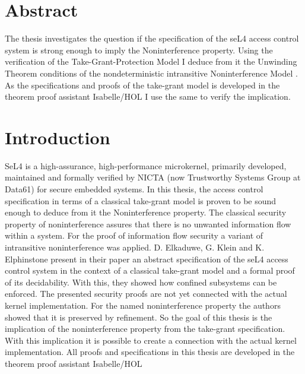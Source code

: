 \documentclass[pdftex,12pt,a4paper]{article}
\begin{document}
	
	\deckblatt
	
	\erklaerung
	
	\clearpage
	\section*{Abstract}
	
	 The thesis investigates the question if the specification of the seL4 access control system is strong enough to imply the Noninterference property. 
Using the verification of the Take-Grant-Protection Model \citep{TakeG} I deduce from it the Unwinding Theorem conditions of the nondeterministic intransitive Noninterference Model \citep{NonOp}. 
As the specifications and proofs of the take-grant model is developed in the theorem proof assistant Isabelle/HOL I use the same to verify the implication. 
	

	\newpage
	
	\tableofcontents
	
	\clearpage
	\section{Introduction}
	SeL4 is a high-assurance, high-performance microkernel, primarily developed, maintained and formally verified by NICTA (now Trustworthy Systems Group at Data61) for secure embedded systems.
In this thesis, the access control specification in terms of a classical take-grant model is proven to be sound enough to deduce from it the Noninterference property.
The classical security property of noninterference assures that there is no unwanted information flow within a system.
For the proof of information flow security  \citep{NonOp} a variant of intransitive noninterference was applied.
D. Elkaduwe, G. Klein and K. Elphinstone present in their paper \citep{TakeG} an abstract specification of the seL4 access control system in the context of a classical take-grant model and a formal proof of its decidability. With this, they showed how confined subsystems can be enforced.
The presented security proofs are not yet connected with the actual kernel implementation.
For the named noninterference property the authors \citep{NonOp} showed that it is preserved by refinement. So the goal of this thesis is the implication of the noninterference property from the take-grant specification. With this implication it is possible to create a connection with the actual kernel implementation.
All proofs and specifications in this thesis are developed in the theorem proof assistant Isabelle/HOL
\end{document}
